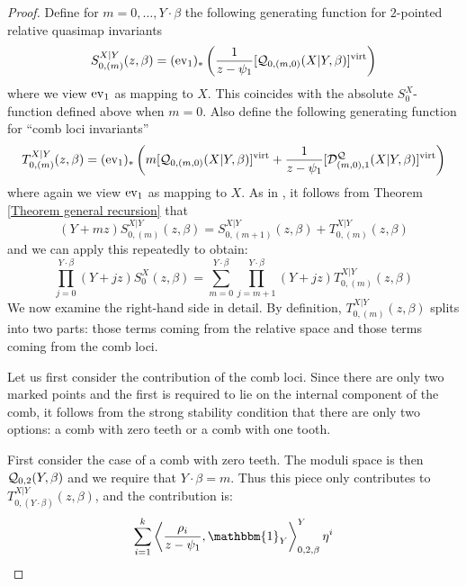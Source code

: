 \begin{proof}
Define for $m = 0, \ldots, Y \cdot \beta$ the following generating function for $2$-pointed relative quasimap invariants
 \[
  S_{0,(m)}^{X|Y}(z,\beta)=(\operatorname{ev}_1)_*\left(\frac{1}{z-\psi_1}[\mathcal{Q}_{0,(m,0)}(X|Y,\beta)]^{\operatorname{virt}}\right)
 \]
where we view $\operatorname{ev}_1$ as mapping to $X$. This coincides with the absolute $S_0^X$-function defined above when $m=0$. Also define the following generating function for ``comb loci invariants''
\[
 T_{0,(m)}^{X|Y}(z,\beta)=(\operatorname{ev}_1)_*\left(m [\mathcal{Q}_{0,(m,0)}(X|Y,\beta)]^{\operatorname{virt}}+\frac{1}{z-\psi_1} [\mathcal{D}^{\mathcal{Q}}_{(m,0),1}(X|Y,\beta)]^{\operatorname{virt}} \right)
\]
where again we view $\operatorname{ev}_1$ as mapping to $X$. As in \cite[Lemma 1.2]{Ga-MF}, it follows from Theorem \ref{Theorem general recursion} that
\begin{equation}
 (Y+mz) S_{0,(m)}^{X|Y}(z,\beta) = S_{0,(m+1)}^{X|Y}(z,\beta)+ T_{0,(m)}^{X|Y}(z,\beta)
\end{equation}
and we can apply this repeatedly to obtain:
\begin{equation} \label{eqn:G}
\prod_{j=0}^{Y\cdot\beta}(Y+jz) S_0^X(z,\beta) = \sum_{m=0}^{Y\cdot\beta}\prod_{j=m+1}^{Y\cdot\beta}(Y+jz)T_{0,(m)}^{X|Y}(z,\beta)
\end{equation}
We now examine the right-hand side in detail. By definition, $T_{0,(m)}^{X|Y}(z,\beta)$ splits into two parts: those terms coming from the relative space and those terms coming from the comb loci.

Let us first consider the contribution of the comb loci. Since there are only two marked points and the first is required to lie on the internal component of the comb, it follows from the strong stability condition that there are only two options: a comb with zero teeth or a comb with one tooth.

First consider the case of a comb with zero teeth. The moduli space is then $\mathcal{Q}_{0,2}(Y,\beta)$ and we require that $Y \cdot \beta = m$. Thus this piece only contributes to $T_{0,(Y\cdot\beta)}^{X|Y}(z,\beta)$, and the contribution is:
\begin{equation*} \sum_{i=1}^k \left\langle \dfrac{\rho_i}{z-\psi_1}, \mathbbm{1}_Y \right\rangle_{0,2,\beta}^Y \eta^i \end{equation*}


\end{proof}
